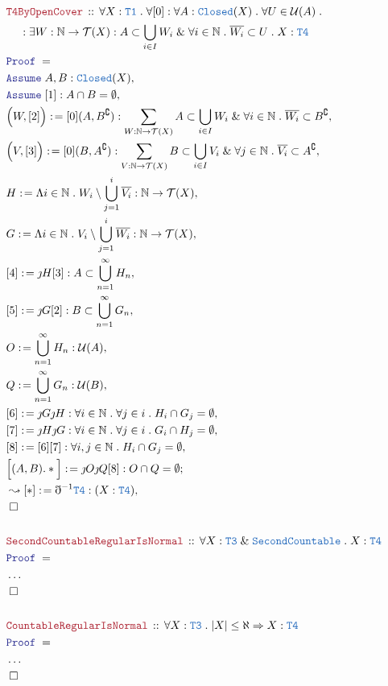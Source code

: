 \documentclass[12pt]{scrartcl}
\newcommand{\TYPE}[1]{\textcolor{NavyBlue}{\mathtt{#1}}}
\newcommand{\LOGIC}[1]{\textcolor{Blue}{\mathtt{#1}}}
\newcommand{\THM}[1]{\textcolor{Maroon}{\mathtt{#1}}}
\renewcommand{\.}{\; . \;}
\newcommand{\de}{: \kern 0.1pc =}
\newcommand{\Theorem}[2]{& \THM{#1} \, :: \, #2 \\ & \Proof = \\ }
\newcommand{\NewLine}{\\ & \kern 1pc}
\newcommand{\Page}[1]{ \begin{align*} #1 \end{align*}   }
\newcommand{ \bd }{ \ByDef }
\newcommand{\NoProof}{ & \ldots \\ \EndProof}
\renewcommand{\And}{\; \& \;}
\newcommand{\Imply}{\Rightarrow}
\newcommand{\Nat}{\mathbb{N} }
\renewcommand{\c}{\complement}
\newcommand{\Say}[3]{& #1 \de #2 : #3, \\}
\newcommand{\Conclude}[3]{& #1 \de #2 : #3; \\}
\newcommand{\Derive}[3]{& \leadsto #1 \de #2 : #3, \\}
\newcommand{\Assume}[2]{& \LOGIC{Assume} \; #1 : #2, \\}
\newcommand{\QED}{\; \square}
\newcommand{\EndProof}{& \QED \\}
\newcommand{\ByDef}{\eth}
\newcommand{\ByConstr}{\jmath}
\newcommand{\Proof}{\LOGIC{Proof} \; }
\newcommand{\T}{\mathcal{T}}
\newcommand{\U}{\mathcal{U}}
\begin{document}
\Page{
	\Theorem{T4ByOpenCover}
	{
		\forall X : \TYPE{T1} \.
		\forall [0] :
		\forall A : \TYPE{Closed}(X) \.
		\forall U \in \U(A) \.
		\NewLine : 
		\exists W : \Nat \to \T(X) : 
		A \subset \bigcup_{i \in I} W_i  \And 
		\forall i \in \Nat \. 
		\overline{W_i} \subset  U \.
		X : \TYPE{T4}
	}
	\Assume{A,B}{\TYPE{Closed}(X)}
	\Assume{[1]}{A \cap B = \emptyset}
	\Say{\Big(W,[2]\Big)}{[0](A,B^\c)}
	{ 
		\sum_{W : \Nat \to \T(X)} 
		A \subset \bigcup_{i \in I} W_i 
		\And
		\forall i \in \Nat \. \overline{W_i} \subset B^\c
	}
	\Say{\Big(V,[3]\Big)}{[0](B,A^\c)}
	{ 
		\sum_{V : \Nat \to \T(X)} 
		B \subset \bigcup_{i \in I} V_i 
		\And
		\forall j \in \Nat \. \overline{V_i} \subset A^\c
	}
	\Say{H}{
		\Lambda i \in \Nat \. W_i \setminus \bigcup_{j=1}^{i} \overline{V_i}  
	}{ \Nat \to \T(X)  }
	\Say{G}{
		\Lambda i \in \Nat \. V_i \setminus \bigcup_{j=1}^{i} \overline{W_i}  
	}{ \Nat \to \T(X)  }
	\Say{[4]}{\ByConstr H [3]}
	{
		A \subset \bigcup^\infty_{n=1} H_n
	}
	\Say{[5]}{\ByConstr G [2]}
	{
		B \subset \bigcup^\infty_{n=1} G_n
	}
	\Say{O}{ \bigcup^\infty_{n=1} H_n }{\U(A)}
	\Say{Q}{\bigcup^\infty_{n=1} G_n}{\U(B)}
	\Say{[6]}{\ByConstr G \ByConstr H}{\forall i \in \Nat \. \forall j \in i \. H_i \cap G_j = \emptyset }
	\Say{[7]}{\ByConstr H \ByConstr G}{\forall i \in \Nat \. \forall j \in i \. G_i \cap H_j = \emptyset }
	\Say{[8]}{ [6][7] }{\forall i,j \in \Nat \. H_i \cap G_j = \emptyset}  
	\Conclude{\Big[(A,B).*\Big]}{ \ByConstr O \ByConstr Q [8]}{ O \cap Q = \emptyset}
	\Derive{[*]}{\bd^{-1}\TYPE{T4} }{ (X : \TYPE{T4}) }
	\EndProof
	\\
	\Theorem{SecondCountableRegularIsNormal}
	{
		\forall X : \TYPE{T3} \And \TYPE{SecondCountable} \. X : \TYPE{T4}
	}
	\NoProof
	\\
	\Theorem{CountableRegularIsNormal}
	{
		\forall X : \TYPE{T3} \. |X| \le  \aleph  \Imply X : \TYPE{T4}
	}
	\NoProof
}
\end{document}
